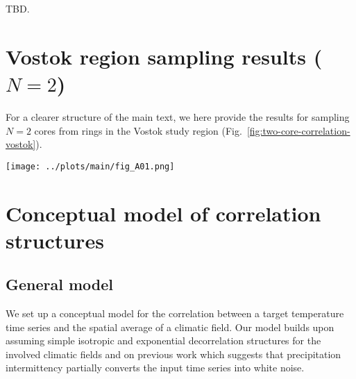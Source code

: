 \documentclass[cp, manuscript]{copernicus}
\begin{document}
TBD.


\appendix

\section{Vostok region sampling results ($N=2$)}
\label{app:vostok.n2}

For a clearer structure of the main text, we here provide the results for
sampling $N=2$ cores from rings in the Vostok study region
(Fig.~\ref{fig:two-core-correlation-vostok}).

\begin{figure*}[t]%
\centering
\texttt{[image: ../plots/main/fig\_A01.png]}
\caption{%
  The expected correlation with the target site temperature for the average of
  two cores in the Vostok region. Shown is the mean correlation of all possible
  single correlations from averaging two grid cells of (\textbf{a})
  $T_{\mathrm{2m}}$, (\textbf{b}) $T_{\mathrm{2m}}^{\mathrm{(pw)}}$ and
  (\textbf{c}) $\delta^{18}\mathrm{O}^{\mathrm{(pw)}}$ time series sampled from
  the same or from two different rings, averaged over all target sites in
  the given region. The axes display the distance from the target, where the $x$
  ($y$) axis stands for the first (second) sampled ring and tickmarks
  indicate the radius of the midpoints of the rings. Note that for
  $\delta^{18}\mathrm{O}^{\mathrm{(pw)}}$ the -- albeit marginal -- correlation
  maximum is located for combining the innermost ring with the ring between
  $500$--$750$\,km.}
\label{fig:two-core-correlation-vostok}%
\end{figure*}%

\section{Conceptual model of correlation structures}
\label{app:concept.model}

\subsection{General model}
\label{app:concept.model.general}

We set up a conceptual model for the correlation between a target temperature
time series and the spatial average of a climatic field. Our model builds upon
assuming simple isotropic and exponential decorrelation structures for the
involved climatic fields and on previous work which suggests that precipitation
intermittency partially converts the input time series into white noise.
\end{document}
